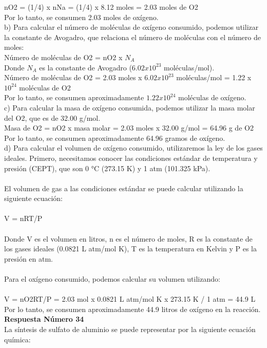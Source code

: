 \documentclass{article}
\begin{document}
nO2 = (1/4) x nNa = (1/4) x 8.12 moles = 2.03 moles de O2\\
Por lo tanto, se consumen 2.03 moles de oxígeno.\\
b) Para calcular el número de moléculas de oxígeno consumido, podemos utilizar la constante de Avogadro, que relaciona el número de moléculas con el número de moles:\\
Número de moléculas de O2 = nO2 x $N_A$\\
Donde $N_A$ es la constante de Avogadro ($6.02 x 10^23$ moléculas/mol).\\
Número de moléculas de O2 = 2.03 moles x $6.02 x 10^23$ moléculas/mol = 1.22 x $10^24$ moléculas de O2\\
Por lo tanto, se consumen aproximadamente $1.22 x 10^24$ moléculas de oxígeno.\\
c) Para calcular la masa de oxígeno consumida, podemos utilizar la masa molar del O2, que es de 32.00 g/mol.\\
Masa de O2 = nO2 x masa molar = 2.03 moles x 32.00 g/mol = 64.96 g de O2\\
Por lo tanto, se consumen aproximadamente 64.96 gramos de oxígeno.\\
d) Para calcular el volumen de oxígeno consumido, utilizaremos la ley de los gases ideales. Primero, necesitamos conocer las condiciones estándar de temperatura y presión (CEPT), que son 0 °C (273.15 K) y 1 atm (101.325 kPa).\\
\\
El volumen de gas a las condiciones estándar se puede calcular utilizando la siguiente ecuación:\\
\\
V = nRT/P\\
\\
Donde V es el volumen en litros, n es el número de moles, R es la constante de los gases ideales (0.0821 L atm/mol K), T es la temperatura en Kelvin y P es la presión en atm.\\
\\
Para el oxígeno consumido, podemos calcular su volumen utilizando:\\
\\
V = nO2RT/P = 2.03 mol x 0.0821 L atm/mol K x 273.15 K / 1 atm = 44.9 L\\
Por lo tanto, se consumen aproximadamente 44.9 litros de oxígeno en la reacción.\\
\textbf{Respuesta Número 34} \\
La síntesis de sulfato de aluminio se puede representar por la siguiente ecuación química:\\
\end{document}
